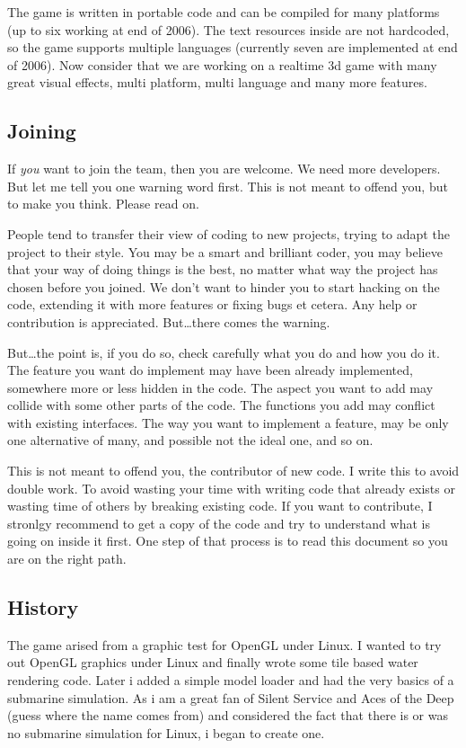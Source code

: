 \documentclass{report}
\begin{document}
The game is written in portable code and can be compiled for many
platforms (up to six working at end of 2006). The text resources inside
are not hardcoded, so the game supports multiple languages (currently
seven are implemented at end of 2006). Now consider that we are working
on a realtime 3d game with many great visual effects, multi platform,
multi language and many more features.

\subsection{Joining}

If \emph{you} want to join the team, then you are welcome. We need more
developers. But let me tell you one warning word first. This is not
meant to offend you, but to make you think. Please read on.

People tend to transfer their view of coding to new projects, trying to
adapt the project to their style. You may be a smart and brilliant
coder, you may believe that your way of doing things is the best, no
matter what way the project has chosen before you joined. We don't want
to hinder you to start hacking on the code, extending it with more
features or fixing bugs et cetera.  Any help or contribution is
appreciated. But\ldots there comes the warning.

But\ldots the point is, if you do so, check carefully what you do and
how you do it. The feature you want do implement may have been already
implemented, somewhere more or less hidden in the code. The aspect you
want to add may collide with some other parts of the code. The functions
you add may conflict with existing interfaces. The way you want to
implement a feature, may be only one alternative of many, and possible
not the ideal one, and so on.

This is not meant to offend you, the contributor of new code. I write
this to avoid double work. To avoid wasting your time with writing code
that already exists or wasting time of others by breaking existing code.
If you want to contribute, I stronlgy recommend to get a copy of the
code and try to understand what is going on inside it first. One step of
that process is to read this document so you are on the right path.

\subsection{History}

The game arised from a graphic test for OpenGL under Linux. I wanted to
try out OpenGL graphics under Linux and finally wrote some tile based
water rendering code. Later i added a simple model loader and had the
very basics of a submarine simulation. As i am a great fan of Silent
Service and Aces of the Deep (guess where the name comes from) and
considered the fact that there is or was no submarine simulation for
Linux, i began to create one.
    
\end{document}
